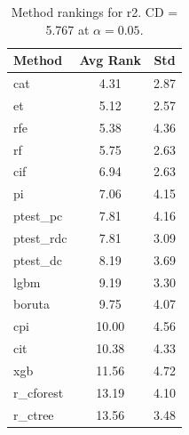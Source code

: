 \begin{table}[h]
\centering
\caption{Method rankings for r2. CD = 5.767 at $\alpha=0.05$.}
\label{tab:ranks_r2}
\begin{tabular}{lcc}
\toprule
Method & Avg Rank & Std \\
\midrule
cat & 4.31 & 2.87 \\
et & 5.12 & 2.57 \\
rfe & 5.38 & 4.36 \\
rf & 5.75 & 2.63 \\
cif & 6.94 & 2.63 \\
pi & 7.06 & 4.15 \\
ptest_pc & 7.81 & 4.16 \\
ptest_rdc & 7.81 & 3.09 \\
ptest_dc & 8.19 & 3.69 \\
lgbm & 9.19 & 3.30 \\
boruta & 9.75 & 4.07 \\
cpi & 10.00 & 4.56 \\
cit & 10.38 & 4.33 \\
xgb & 11.56 & 4.72 \\
r_cforest & 13.19 & 4.10 \\
r_ctree & 13.56 & 3.48 \\
\bottomrule
\end{tabular}
\end{table}